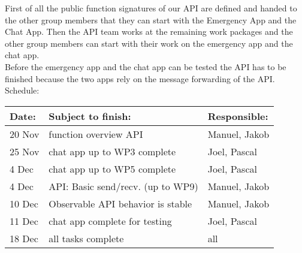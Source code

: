 First of all the public function signatures of our API are defined and handed to the other group members that they can start with the Emergency App and the Chat App. Then the API team works at the remaining work packages and the other group members can start with their work on the emergency app and the chat app. \\[3mm]
Before the emergency app and the chat app can be tested the API has to be finished because the two apps rely on the message forwarding of the API. \\[3mm]
Schedule: \\
\begin{center}
\begin{tabular}{|l|l|l|}
		\hline
		Date: & Subject to finish: & Responsible: \\ \hline
		20 Nov & function overview API & Manuel, Jakob \\
		25 Nov & chat app up to WP3 complete & Joel, Pascal \\
		4 Dec & chat app up to WP5 complete & Joel, Pascal \\
		4 Dec & API: Basic send/recv. (up to WP9) & Manuel, Jakob \\
		10 Dec & Observable API behavior is stable & Manuel, Jakob \\
		11 Dec & chat app complete for testing & Joel, Pascal \\
		18 Dec & all tasks complete & all\\
		\hline
	\end{tabular}
\end{center}